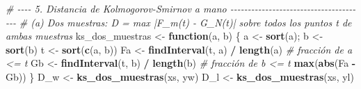 \documentclass[
  spanish,
]{article}
\newenvironment{Shaded}{\begin{snugshade}}{\end{snugshade}}
\newcommand{\CommentTok}[1]{\textcolor[rgb]{0.56,0.35,0.01}{\textit{#1}}}
\newcommand{\ControlFlowTok}[1]{\textcolor[rgb]{0.13,0.29,0.53}{\textbf{#1}}}
\newcommand{\FunctionTok}[1]{\textcolor[rgb]{0.13,0.29,0.53}{\textbf{#1}}}
\newcommand{\NormalTok}[1]{#1}
\newcommand{\OtherTok}[1]{\textcolor[rgb]{0.56,0.35,0.01}{#1}}
\newcommand{\SpecialCharTok}[1]{\textcolor[rgb]{0.81,0.36,0.00}{\textbf{#1}}}
\begin{document}
\begin{Shaded}
\begin{Highlighting}[]
\CommentTok{\# {-}{-}{-}{-} 5. Distancia de Kolmogorov{-}Smirnov a mano {-}{-}{-}{-}{-}{-}{-}{-}{-}{-}{-}{-}{-}{-}{-}{-}{-}{-}{-}{-}{-}{-}{-}{-}{-}{-}{-}{-}{-}{-}{-}{-}{-}{-}{-}{-}{-}{-}{-}}
\CommentTok{\# (a) Dos muestras: D = max |F\_m(t) {-} G\_N(t)| sobre todos los puntos t de ambas muestras}
\NormalTok{ks\_dos\_muestras }\OtherTok{\textless{}{-}} \ControlFlowTok{function}\NormalTok{(a, b) \{}
\NormalTok{  a }\OtherTok{\textless{}{-}} \FunctionTok{sort}\NormalTok{(a); b }\OtherTok{\textless{}{-}} \FunctionTok{sort}\NormalTok{(b)}
\NormalTok{  t }\OtherTok{\textless{}{-}} \FunctionTok{sort}\NormalTok{(}\FunctionTok{c}\NormalTok{(a, b))}
\NormalTok{  Fa }\OtherTok{\textless{}{-}} \FunctionTok{findInterval}\NormalTok{(t, a) }\SpecialCharTok{/} \FunctionTok{length}\NormalTok{(a)           }\CommentTok{\# fracción de a \textless{}= t}
\NormalTok{  Gb }\OtherTok{\textless{}{-}} \FunctionTok{findInterval}\NormalTok{(t, b) }\SpecialCharTok{/} \FunctionTok{length}\NormalTok{(b)           }\CommentTok{\# fracción de b \textless{}= t}
  \FunctionTok{max}\NormalTok{(}\FunctionTok{abs}\NormalTok{(Fa }\SpecialCharTok{{-}}\NormalTok{ Gb))}
\NormalTok{\}}
\NormalTok{D\_w }\OtherTok{\textless{}{-}} \FunctionTok{ks\_dos\_muestras}\NormalTok{(xs, yw)}
\NormalTok{D\_l }\OtherTok{\textless{}{-}} \FunctionTok{ks\_dos\_muestras}\NormalTok{(xs, yl)}


\end{Highlighting}
\end{Shaded}
\end{document}
